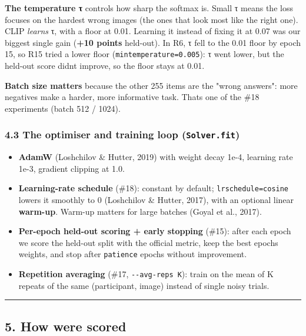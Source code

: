 \documentclass[
  11pt,
]{article}
\providecommand{\tightlist}{%
  \setlength{\itemsep}{0pt}\setlength{\parskip}{0pt}}
\renewcommand{\_}{\oldunderscore\allowbreak}
\begin{document}
\textbf{The temperature τ} controls how
sharp the softmax is. Small τ means the
loss focuses on the hardest wrong images
(the ones that look most like the right
one). CLIP \emph{learns} τ, with a floor
at 0.01. Learning it instead of fixing
it at 0.07 was our biggest single gain
(\textbf{+10 points} held-out). In R6, τ
fell to the 0.01 floor by epoch 15, so
R15 tried a lower floor
(\texttt{min\_temperature=0.005}): τ
went lower, but the held-out score
didn\textquotesingle t improve, so the
floor stays at 0.01.

\textbf{Batch size matters} because the
other 255 items are the "wrong answers":
more negatives make a harder, more
informative task. That\textquotesingle s
one of the \#18 experiments (batch 512 /
1024).

\subsubsection{\texorpdfstring{4.3 The
optimiser and training loop
(\texttt{Solver.fit})}{4.3 The optimiser and training loop (Solver.fit)}}\label{the-optimiser-and-training-loop-solver.fit}

\begin{itemize}
\tightlist
\item
  \textbf{AdamW} (Loshchilov \& Hutter,
  2019) with weight decay 1e-4, learning
  rate 1e-3, gradient clipping at 1.0.
\item
  \textbf{Learning-rate schedule}
  (\#18): constant by default;
  \texttt{lr\_schedule=\textquotesingle{}cosine\textquotesingle{}}
  lowers it smoothly to 0 (Loshchilov \&
  Hutter, 2017), with an optional linear
  \textbf{warm-up}. Warm-up matters for
  large batches (Goyal et al., 2017).
\item
  \textbf{Per-epoch held-out scoring +
  early stopping} (\#15): after each
  epoch we score the held-out split with
  the official metric, keep the best
  epoch\textquotesingle s weights, and
  stop after \texttt{patience} epochs
  without improvement.
\item
  \textbf{Repetition averaging} (\#17,
  \texttt{-\/-avg-reps\ K}): train on
  the mean of K repeats of the same
  (participant, image) instead of single
  noisy trials.
\end{itemize}

\begin{center}\rule{0.5\linewidth}{0.5pt}\end{center}

\subsection{5. How we\textquotesingle re
scored}\label{how-were-scored}
\end{document}
